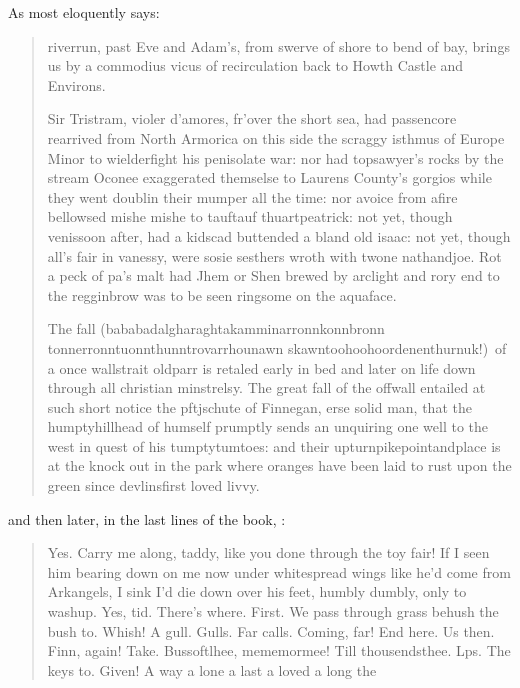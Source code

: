   As \citet[P~1 complete]{Joyce:FW} most eloquently says:
  \begin{quotation}\small
    riverrun, past Eve and Adam's, from swerve of shore to bend of
    bay, brings us by a commodius vicus of recirculation back to Howth
    Castle and Environs.
    
    Sir Tristram, violer d'amores, fr'over the short sea, had
    passencore rearrived from North Armorica on this side the scraggy
    isthmus of Europe Minor to wielderfight his penisolate war: nor
    had topsawyer's rocks by the stream Oconee exaggerated themselse
    to Laurens County's gorgios while they went doublin their mumper
    all the time: nor avoice from afire bellowsed mishe mishe to
    tauftauf thuartpeatrick: not yet, though venissoon after, had a
    kidscad buttended a bland old isaac: not yet, though all's fair in
    vanessy, were sosie sesthers wroth with twone nathandjoe. Rot a
    peck of pa's malt had Jhem or Shen brewed by arclight and rory end
    to the regginbrow was to be seen ringsome on the aquaface.
        
    The fall
    (baba\-badal\-gharagh\-takammi\-narronn\-konn\-bronn\-%
    ton\-ne\-rronn\-tuonn\-thunn\-trovar\-rhoun\-awn\-%
    skawn\-too\-hoo\-hoor\-den\-ent\-hur\-nuk!)\ of
    a once wallstrait oldparr is retaled early in bed and later on
    life down through all christian minstrelsy. The great fall of the
    offwall entailed at such short notice the pftjschute of Finnegan,
    erse solid man, that the humptyhillhead of humself prumptly sends
    an unquiring one well to the west in quest of his tumptytumtoes:
    and their upturnpikepointandplace is at the knock out in the park
    where oranges have been laid to rust upon the green since
    devlinsfirst loved livvy.
  \end{quotation}
  and then later, in the last lines of the book, \citep[P~627,
  Lines 8--16]{Joyce:FW}:
  \begin{quote}\small
    Yes. Carry me along, taddy, like you done through the toy fair! If
    I seen him bearing down on me now under whitespread wings like
    he'd come from Arkangels, I sink I'd die down over his feet,
    humbly dumbly, only to washup. Yes, tid. There's where. First. We
    pass through grass behush the bush to. Whish! A gull. Gulls. Far
    calls. Coming, far! End here.  Us then. Finn, again! Take.
    Bussoftlhee, mememormee! Till thousendsthee. Lps. The keys to.
    Given! A way a lone a last a loved a long the
  \end{quote}
